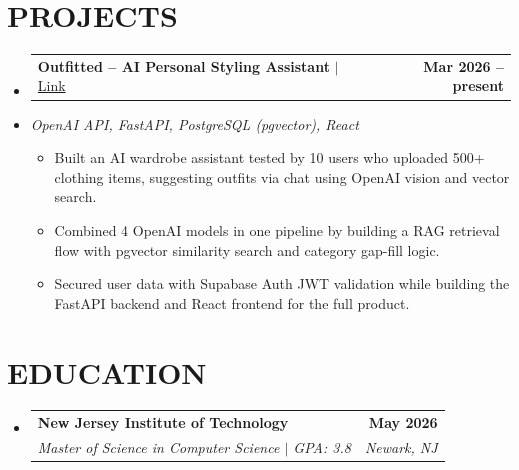 \documentclass[letterpaper,11pt]{article}
\makeatletter
\newcommand{\resumeItem}[1]{
  \item\small{#1\vspace{-3pt}}
}
\newcommand{\resumeStack}[1]{
  \vspace{1pt}\item\small{\textit{#1}}\vspace{-6pt}
}
\newcommand{\resumeSubheading}[4]{
  \vspace{-3pt}\item
    \begin{tabular*}{1.0\textwidth}[t]{l@{\extracolsep{\fill}}r}
      \textbf{#1} & \textbf{\small #2} \\
      \textit{\small#3} & \textit{\small #4} \\
    \end{tabular*}\vspace{-9pt}
}
\newcommand{\resumeProjectHeading}[2]{
    \item
    \begin{tabular*}{1.001\textwidth}{l@{\extracolsep{\fill}}r}
      \small#1 & \textbf{\small #2}\\
    \end{tabular*}\vspace{-9pt}
}
\newcommand{\resumeItemListStart}{\begin{itemize}[leftmargin=0.15in, label=$\bullet$]}
\newcommand{\resumeItemListEnd}{\end{itemize}\vspace{-7pt}}
\newcommand{\resumeSubHeadingListStart}{\begin{itemize}[leftmargin=0.0in, label={}]}
\newcommand{\resumeSubHeadingListEnd}{\end{itemize}}
\makeatother
\begin{document}
\section{PROJECTS}
\resumeSubHeadingListStart

\resumeProjectHeading
{\textbf{Outfitted -- AI Personal Styling Assistant} $|$ \href{https://github.com/talaviyakhushi/outfitted}{Link}}{Mar 2026 -- present}
\vspace{-9pt}
\resumeStack{OpenAI API, FastAPI, PostgreSQL (pgvector), React}
\resumeItemListStart
  \resumeItem{Built an AI wardrobe assistant tested by 10 users who uploaded 500+ clothing items, suggesting outfits via chat using OpenAI vision and vector search.}
  \resumeItem{Combined 4 OpenAI models in one pipeline by building a RAG retrieval flow with pgvector similarity search and category gap-fill logic.}
  \resumeItem{Secured user data with Supabase Auth JWT validation while building the FastAPI backend and React frontend for the full product.}
\resumeItemListEnd

\resumeSubHeadingListEnd
\vspace{-3pt}
\section{EDUCATION}
\vspace{1pt}
\resumeSubHeadingListStart
\vspace{5pt}
\resumeSubheading
{New Jersey Institute of Technology}{May 2026}
{Master of Science in Computer Science $|$ GPA: 3.8}{Newark, NJ}
\resumeSubHeadingListEnd
\end{document}
